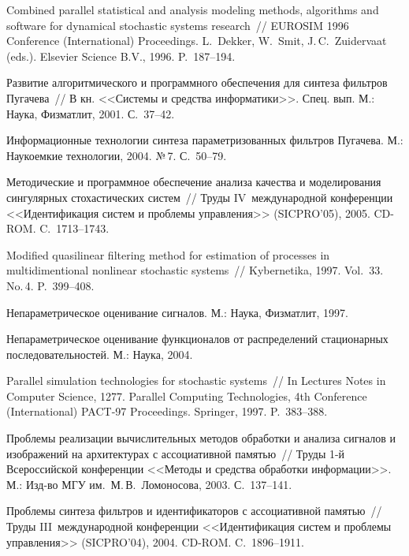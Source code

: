 \begin{multicols}{2}
{{\begin{thebibliography}{99}
Combined parallel statistical and analysis modeling methods,
algorithms and software for dynamical  stochastic systems
research~// EUROSIM 1996  Conference (International) Proceedings.
L.~Dekker, W.~Smit, J.\,C.~Zuidervaat (eds.).
Elsevier Science B.V., 1996. P.~187--194.

Развитие алгоритмического и программного
обеспечения для синтеза фильтров Пугачева~// В кн. <<Системы и
средства информатики>>. Спец. вып.  М.: Наука, Физматлит, 2001.
С.~37--42.

Информационные технологии синтеза параметризованных фильтров
Пугачева. М.:  Наукоемкие технологии, 2004. №\,7. С.~50--79.

 Методические и про\-грам\-мное обеспечение анализа качества и 
моделирования сингулярных стохастических систем~//  Труды IV~международной 
конференции <<Идентификация систем и проблемы управления>> (SICPRO'05), 2005. 
CD-ROM. C.~1713--1743.

Modified quasilinear filtering method
for estimation of processes in multidimentional nonlinear
stochastic systems~//  Kybernetika, 1997.  Vol.~33. No.\,4.
P.~399--408.

Непараметрическое  оценивание сигналов. М.: Наука, Физматлит, 1997.

Непараметрическое оценивание функционалов от распределений
стационарных последовательностей. М.: Наука, 2004.

 Parallel simulation technologies for stochastic systems~// 
In Lectures Notes in Computer Science, 1277. Parallel Computing Technologies, 
4th Conference (International) PACT-97 Proceedings. Springer, 1997. 
P.~383--388.

Проблемы реализации вычислительных методов обработки и анализа
сигналов и изоб\-ра\-же\-ний на архитектурах с ассоциативной памятью~//
Труды 1-й Всероссийской конференции <<Методы и средства
обработки информации>>. М.: Изд-во МГУ им.~М.\,В.~Ломоносова, 2003.
С.~137--141.

Проблемы синтеза фильтров и идентификаторов с ассоциативной памятью~//
 Труды III~международной конференции <<Идентификация систем и проблемы
управления>> (SICPRO'04), 2004. CD-ROM.
C.~1896--1911.


\end{thebibliography}}}
\end{multicols}

